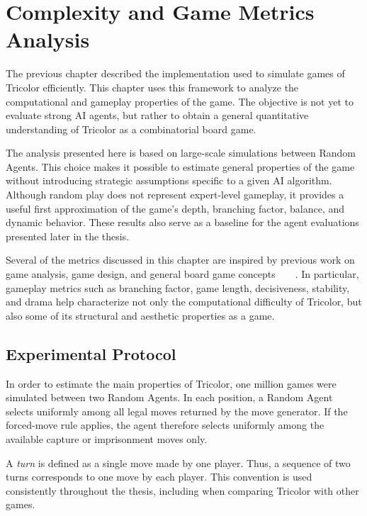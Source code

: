 \chapter{Complexity and Game Metrics Analysis}
\label{game_metrics}

The previous chapter described the implementation used to simulate games of Tricolor efficiently. This chapter uses this framework to analyze the computational and gameplay properties of the game. The objective is not yet to evaluate strong AI agents, but rather to obtain a general quantitative understanding of Tricolor as a combinatorial board game.

The analysis presented here is based on large-scale simulations between Random Agents. This choice makes it possible to estimate general properties of the game without introducing strategic assumptions specific to a given AI algorithm. Although random play does not represent expert-level gameplay, it provides a useful first approximation of the game’s depth, branching factor, balance, and dynamic behavior. These results also serve as a baseline for the agent evaluations presented later in the thesis.

Several of the metrics discussed in this chapter are inspired by previous work on game analysis, game design, and general board game concepts~\cite{shannon1950chess2}~\cite{browne2010evolutionary}~\cite{russell2010aima}~\cite{browne2008recombination}. In particular, gameplay metrics such as branching factor, game length, decisiveness, stability, and drama help characterize not only the computational difficulty of Tricolor, but also some of its structural and aesthetic properties as a game.

\section{Experimental Protocol}

In order to estimate the main properties of Tricolor, one million games were simulated between two Random Agents. In each position, a Random Agent selects uniformly among all legal moves returned by the move generator. If the forced-move rule applies, the agent therefore selects uniformly among the available capture or imprisonment moves only.

A \textit{turn} is defined as a single move made by one player. Thus, a sequence of two turns corresponds to one move by each player. This convention is used consistently throughout the thesis, including when comparing Tricolor with other games.

